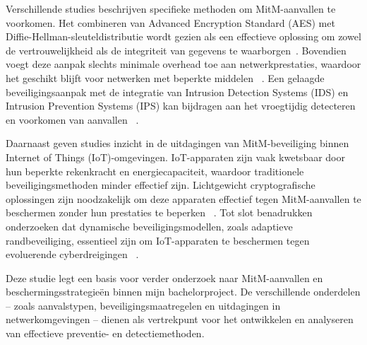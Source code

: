 Verschillende studies beschrijven specifieke methoden om MitM-aanvallen te voorkomen. Het combineren van Advanced Encryption Standard (AES) met Diffie-Hellman-sleuteldistributie wordt gezien als een effectieve oplossing om zowel de vertrouwelijkheid als de integriteit van gegevens te waarborgen~\autocite{ELRAWY2023}. Bovendien voegt deze aanpak slechts minimale overhead toe aan netwerkprestaties, waardoor het geschikt blijft voor netwerken met beperkte middelen ~\autocite{HALGAMUGE2025}. Een gelaagde beveiligingsaanpak met de integratie van Intrusion Detection Systems (IDS) en Intrusion Prevention Systems (IPS) kan bijdragen aan het vroegtijdig detecteren en voorkomen van aanvallen   ~\autocite{ANKARI2022}.

Daarnaast geven studies inzicht in de uitdagingen van MitM-beveiliging binnen Internet of Things (IoT)-omgevingen. IoT-apparaten zijn vaak kwetsbaar door hun beperkte rekenkracht en energiecapaciteit, waardoor traditionele beveiligingsmethoden minder effectief zijn. Lichtgewicht cryptografische oplossingen zijn noodzakelijk om deze apparaten effectief tegen MitM-aanvallen te beschermen zonder hun prestaties te beperken ~\autocite{ANKARI2022}. Tot slot benadrukken onderzoeken dat dynamische beveiligingsmodellen, zoals adaptieve randbeveiliging, essentieel zijn om IoT-apparaten te beschermen tegen evoluerende cyberdreigingen ~\autocite{HALGAMUGE2025}.

Deze studie legt een basis voor verder onderzoek naar MitM-aanvallen en beschermingsstrategieën binnen mijn bachelorproject. De verschillende onderdelen – zoals aanvalstypen, beveiligingsmaatregelen en uitdagingen in  netwerkomgevingen – dienen als vertrekpunt voor het ontwikkelen en analyseren van effectieve preventie- en detectiemethoden.



